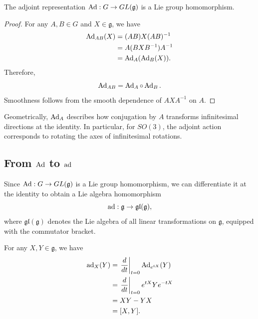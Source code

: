 \documentclass[../main.tex]{subfiles}
\begin{document}
\begin{proposition}{}{}
  The adjoint representation $\operatorname{Ad}:G\to GL(\mathfrak{g})$ is a Lie group homomorphism.
\end{proposition}
\begin{proof}
  For any $A,B\in G$ and $X\in\mathfrak{g}$, we have
  \begin{equation}
    \begin{aligned}
      \operatorname{Ad}_{AB}(X)
      &=(AB)X(AB)^{-1}\\
      &=A(BXB^{-1})A^{-1}\\
      &=\operatorname{Ad}_A(\operatorname{Ad}_B(X)).
    \end{aligned}
  \end{equation}
  Therefore,
  \begin{equation}
    \operatorname{Ad}_{AB}=\operatorname{Ad}_A\circ\operatorname{Ad}_B.
  \end{equation}
  Smoothness follows from the smooth dependence of $AXA^{-1}$ on $A$.
\end{proof}

Geometrically, $\operatorname{Ad}_A$ describes how conjugation by $A$ transforms infinitesimal directions at the identity. In particular, for $SO(3)$, the adjoint action corresponds to rotating the axes of infinitesimal rotations.

\subsection{From $\operatorname{Ad}$ to $\operatorname{ad}$}

Since $\operatorname{Ad}:G\to GL(\mathfrak{g})$ is a Lie group homomorphism, we can differentiate it at the identity to obtain a Lie algebra homomorphism
\begin{equation}
  \operatorname{ad}:\mathfrak{g}\to\mathfrak{gl}(\mathfrak{g}),
\end{equation}
where $\mathfrak{gl}(\mathfrak{g})$ denotes the Lie algebra of all linear transformations on $\mathfrak{g}$, equipped with the commutator bracket.

For any $X,Y\in\mathfrak{g}$, we have
\begin{equation}
  \begin{aligned}
    \operatorname{ad}_X(Y)
    &=\left.\frac{d}{dt}\right|_{t=0}
      \operatorname{Ad}_{e^{tX}}(Y)\\
    &=\left.\frac{d}{dt}\right|_{t=0}
      e^{tX}Ye^{-tX}\\
    &=XY-YX\\
    &=[X,Y].
  \end{aligned}
\end{equation}
\end{document}

